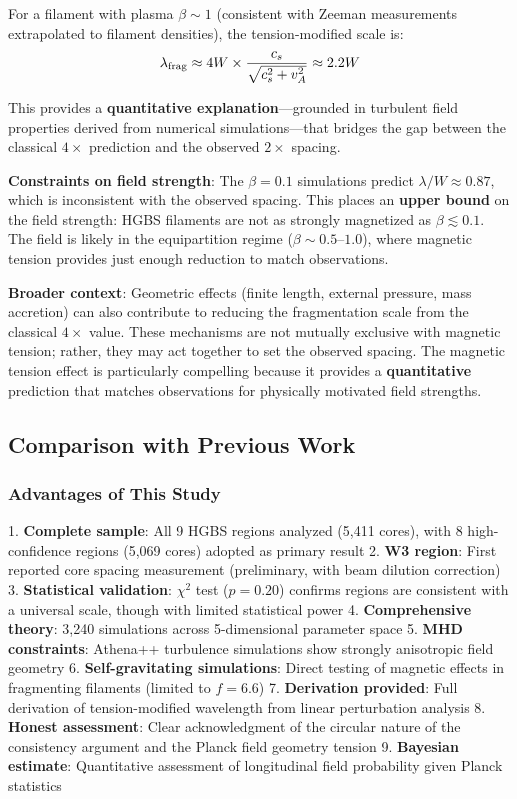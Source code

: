 \documentclass[11pt,a4paper]{article}
\begin{document}
For a filament with plasma $\beta \sim 1$ (consistent with Zeeman measurements extrapolated to filament densities), the tension-modified scale is:
\begin{equation}
\lambda_{\rm frag} \approx 4W \times \frac{c_s}{\sqrt{c_s^2 + v_A^2}} \approx 2.2W
\label{eq:tension2}
\end{equation}

This provides a \textbf{quantitative explanation}—grounded in turbulent field properties derived from numerical simulations—that bridges the gap between the classical $4\times$ prediction and the observed $2\times$ spacing.

\textbf{Constraints on field strength}: The $\beta = 0.1$ simulations predict $\lambda/W \approx 0.87$, which is inconsistent with the observed spacing. This places an \textbf{upper bound} on the field strength: HGBS filaments are not as strongly magnetized as $\beta \lesssim 0.1$. The field is likely in the equipartition regime ($\beta \sim 0.5$--$1.0$), where magnetic tension provides just enough reduction to match observations.

\textbf{Broader context}: Geometric effects (finite length, external pressure, mass accretion) can also contribute to reducing the fragmentation scale from the classical $4\times$ value. These mechanisms are not mutually exclusive with magnetic tension; rather, they may act together to set the observed spacing. The magnetic tension effect is particularly compelling because it provides a \textbf{quantitative} prediction that matches observations for physically motivated field strengths.

\subsection{Comparison with Previous Work}

\subsubsection{Advantages of This Study}

1. \textbf{Complete sample}: All 9 HGBS regions analyzed (5,411 cores), with 8 high-confidence regions (5,069 cores) adopted as primary result
2. \textbf{W3 region}: First reported core spacing measurement (preliminary, with beam dilution correction)
3. \textbf{Statistical validation}: $\chi^2$ test ($p=0.20$) confirms regions are consistent with a universal scale, though with limited statistical power
4. \textbf{Comprehensive theory}: 3,240 simulations across 5-dimensional parameter space
5. \textbf{MHD constraints}: Athena++ turbulence simulations show strongly anisotropic field geometry
6. \textbf{Self-gravitating simulations}: Direct testing of magnetic effects in fragmenting filaments (limited to $f = 6.6$)
7. \textbf{Derivation provided}: Full derivation of tension-modified wavelength from linear perturbation analysis
8. \textbf{Honest assessment}: Clear acknowledgment of the circular nature of the consistency argument and the Planck field geometry tension
9. \textbf{Bayesian estimate}: Quantitative assessment of longitudinal field probability given Planck statistics
\end{document}
